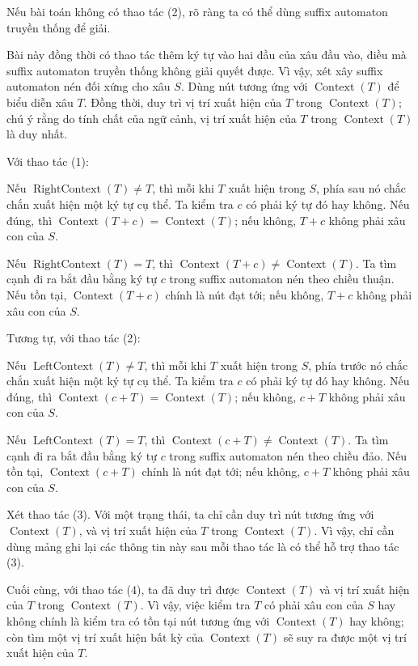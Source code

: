 \documentclass[11pt]{article}
\begin{document}
Nếu bài toán không có thao tác (2), rõ ràng ta có thể dùng suffix automaton
truyền thống để giải.

Bài này đồng thời có thao tác thêm ký tự vào hai đầu của xâu đầu vào, điều mà
suffix automaton truyền thống không giải quyết được. Vì vậy, xét xây suffix
automaton nén đối xứng cho xâu \(S\). Dùng nút tương ứng với
\(\operatorname{Context}(T)\) để biểu diễn xâu \(T\). Đồng thời, duy trì vị trí
xuất hiện của \(T\) trong \(\operatorname{Context}(T)\); chú ý rằng do tính chất
của ngữ cảnh, vị trí xuất hiện của \(T\) trong \(\operatorname{Context}(T)\) là
duy nhất.

Với thao tác (1):

Nếu \(\operatorname{RightContext}(T)\ne T\), thì mỗi khi \(T\) xuất hiện trong
\(S\), phía sau nó chắc chắn xuất hiện một ký tự cụ thể. Ta kiểm tra \(c\) có
phải ký tự đó hay không. Nếu đúng, thì
\(\operatorname{Context}(T+c)=\operatorname{Context}(T)\); nếu không,
\(T+c\) không phải xâu con của \(S\).

Nếu \(\operatorname{RightContext}(T)=T\), thì
\(\operatorname{Context}(T+c)\ne\operatorname{Context}(T)\). Ta tìm cạnh đi ra
bắt đầu bằng ký tự \(c\) trong suffix automaton nén theo chiều thuận. Nếu tồn
tại, \(\operatorname{Context}(T+c)\) chính là nút đạt tới; nếu không,
\(T+c\) không phải xâu con của \(S\).

Tương tự, với thao tác (2):

Nếu \(\operatorname{LeftContext}(T)\ne T\), thì mỗi khi \(T\) xuất hiện trong
\(S\), phía trước nó chắc chắn xuất hiện một ký tự cụ thể. Ta kiểm tra \(c\) có
phải ký tự đó hay không. Nếu đúng, thì
\(\operatorname{Context}(c+T)=\operatorname{Context}(T)\); nếu không,
\(c+T\) không phải xâu con của \(S\).

Nếu \(\operatorname{LeftContext}(T)=T\), thì
\(\operatorname{Context}(c+T)\ne\operatorname{Context}(T)\). Ta tìm cạnh đi ra
bắt đầu bằng ký tự \(c\) trong suffix automaton nén theo chiều đảo. Nếu tồn
tại, \(\operatorname{Context}(c+T)\) chính là nút đạt tới; nếu không,
\(c+T\) không phải xâu con của \(S\).

Xét thao tác (3). Với một trạng thái, ta chỉ cần duy trì nút tương ứng với
\(\operatorname{Context}(T)\), và vị trí xuất hiện của \(T\) trong
\(\operatorname{Context}(T)\). Vì vậy, chỉ cần dùng mảng ghi lại các thông tin
này sau mỗi thao tác là có thể hỗ trợ thao tác (3).

Cuối cùng, với thao tác (4), ta đã duy trì được \(\operatorname{Context}(T)\)
và vị trí xuất hiện của \(T\) trong \(\operatorname{Context}(T)\). Vì vậy, việc
kiểm tra \(T\) có phải xâu con của \(S\) hay không chính là kiểm tra có tồn tại
nút tương ứng với \(\operatorname{Context}(T)\) hay không; còn tìm một vị trí
xuất hiện bất kỳ của \(\operatorname{Context}(T)\) sẽ suy ra được một vị trí
xuất hiện của \(T\).
\end{document}
